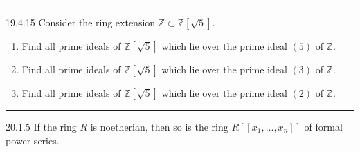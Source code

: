 \documentclass[letterpaper, 12pt]{article}
\begin{document}
\noindent\rule{7in}{2.8pt}
\begin{problem}{19.4.15}
Consider the ring extension \(\mathbb{Z}\subset \mathbb{Z}[\sqrt{5}]\).
\begin{enumerate}[(1)]
\item Find all prime ideals of \(\mathbb{Z}[\sqrt{5}]\) which lie over the prime ideal \((5)\) of \(\mathbb{Z}\).
\item Find all prime ideals of \(\mathbb{Z}[\sqrt{5}]\) which lie over the prime ideal \((3)\) of \(\mathbb{Z}\).
\item Find all prime ideals of \(\mathbb{Z}[\sqrt{5}]\) which lie over the prime ideal \((2)\) of \(\mathbb{Z}\).
\end{enumerate}
\end{problem}
\begin{solution}

\end{solution}

\noindent\rule{7in}{2.8pt}
\begin{problem}{20.1.5}
If the ring \(R\) is noetherian, then so is the ring \(R[[x_1,\ldots,x_n]]\) of formal power series.
\end{problem}
\begin{solution}

\end{solution}
\end{document}
